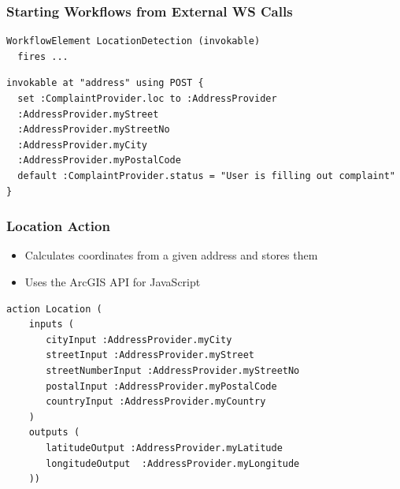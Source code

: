 
\begin{frame}[fragile]
	\frametitle{Starting Workflows from External WS Calls}
\begin{lstlisting}[basicstyle=\footnotesize\ttfamily]
WorkflowElement LocationDetection (invokable)
  fires ...
\end{lstlisting}
\begin{lstlisting}[basicstyle=\footnotesize\ttfamily]		
invokable at "address" using POST {
  set :ComplaintProvider.loc to :AddressProvider
  :AddressProvider.myStreet
  :AddressProvider.myStreetNo
  :AddressProvider.myCity
  :AddressProvider.myPostalCode
  default :ComplaintProvider.status = "User is filling out complaint" 
}
\end{lstlisting}
\end{frame}


\begin{frame}[fragile]
\frametitle{Location Action}

\begin{itemize}
\item Calculates coordinates from a given address and stores them
\item Uses the ArcGIS API for JavaScript
\end{itemize}

\begin{lstlisting}[basicstyle=\footnotesize\ttfamily]
action Location (
    inputs (
       cityInput :AddressProvider.myCity
       streetInput :AddressProvider.myStreet
       streetNumberInput :AddressProvider.myStreetNo
       postalInput :AddressProvider.myPostalCode
       countryInput :AddressProvider.myCountry
    )
    outputs (
       latitudeOutput :AddressProvider.myLatitude
       longitudeOutput  :AddressProvider.myLongitude
    ))		 				
\end{lstlisting}

\end{frame}


